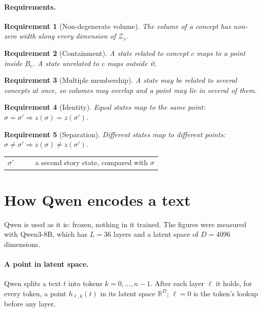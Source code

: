 \documentclass[11pt]{article}
\makeatletter
\newtheorem{requirement}{Requirement}
\theoremstyle{remark}
\newcommand{\R}{\mathbb{R}}
\newenvironment{symbols}
  {\par\smallskip\noindent\small\begin{tabular}{@{}>{$}l<{$}@{\quad}p{0.82\linewidth}@{}}}
  {\end{tabular}\par\medskip}
\makeatother
\begin{document}
\paragraph{Requirements.}
\begin{requirement}[Non-degenerate volume]\label{req:volume}
The volume of a concept has non-zero width along every dimension of $\mathcal{Z}_s$.
\end{requirement}
\begin{requirement}[Containment]\label{req:contain}
A state related to concept $c$ maps to a point inside $B_c$. A state unrelated to $c$ maps outside it.
\end{requirement}
\begin{requirement}[Multiple membership]\label{req:multi}
A state may be related to several concepts at once, so volumes may overlap and a point may lie in several of them.
\end{requirement}
\begin{requirement}[Identity]\label{req:identity}
Equal states map to the same point: $\sigma = \sigma' \Rightarrow z(\sigma) = z(\sigma')$.
\end{requirement}
\begin{requirement}[Separation]\label{req:separation}
Different states map to different points: $\sigma \neq \sigma' \Rightarrow z(\sigma) \neq z(\sigma')$.
\end{requirement}
\begin{symbols}
\sigma' & a second story state, compared with $\sigma$ \\
\end{symbols}

\section{How Qwen encodes a text}\label{sec:qwen}

Qwen is used as it is: frozen, nothing in it trained. The figures were measured with Qwen3-8B, which has $L = 36$ layers and a latent space of $D = 4096$ dimensions.

\paragraph{A point in latent space.} Qwen splits a text $t$ into tokens $k = 0, \dots, n-1$. After each layer $\ell$ it holds, for every token, a point $h_{\ell,k}(t)$ in its latent space $\R^D$; $\ell = 0$ is the token's lookup before any layer.
\end{document}
